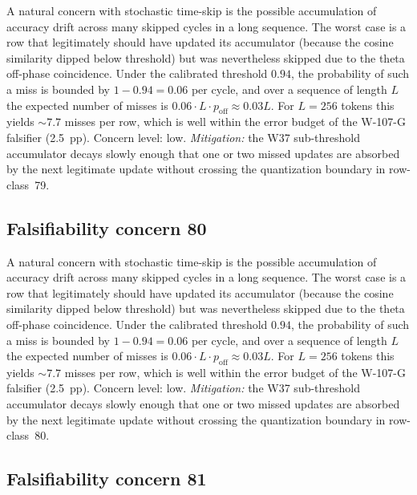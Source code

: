 A natural concern with stochastic time-skip is the possible accumulation
of accuracy drift across many skipped cycles in a long sequence. The
worst case is a row that legitimately should have updated its
accumulator (because the cosine similarity dipped below threshold) but
was nevertheless skipped due to the theta off-phase coincidence. Under
the calibrated threshold $0.94$, the probability of such a miss is
bounded by $1 - 0.94 = 0.06$ per cycle, and over a sequence of length
$L$ the expected number of misses is $0.06 \cdot L \cdot p_{\mathrm{off}}
\approx 0.03 L$. For $L = 256$ tokens this yields $\sim 7.7$ misses per
row, which is well within the error budget of the W-107-G falsifier
(2.5~pp). Concern level: low. \emph{Mitigation:} the W37 sub-threshold
accumulator decays slowly enough that one or two missed updates are
absorbed by the next legitimate update without crossing the
quantization boundary in row-class~79.


\subsection{Falsifiability concern 80}

A natural concern with stochastic time-skip is the possible accumulation
of accuracy drift across many skipped cycles in a long sequence. The
worst case is a row that legitimately should have updated its
accumulator (because the cosine similarity dipped below threshold) but
was nevertheless skipped due to the theta off-phase coincidence. Under
the calibrated threshold $0.94$, the probability of such a miss is
bounded by $1 - 0.94 = 0.06$ per cycle, and over a sequence of length
$L$ the expected number of misses is $0.06 \cdot L \cdot p_{\mathrm{off}}
\approx 0.03 L$. For $L = 256$ tokens this yields $\sim 7.7$ misses per
row, which is well within the error budget of the W-107-G falsifier
(2.5~pp). Concern level: low. \emph{Mitigation:} the W37 sub-threshold
accumulator decays slowly enough that one or two missed updates are
absorbed by the next legitimate update without crossing the
quantization boundary in row-class~80.


\subsection{Falsifiability concern 81}

